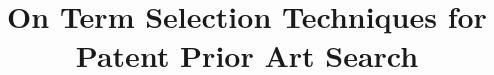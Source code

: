 \documentclass{sig-alternate-2013}
\begin{document}
%

\title{On Term Selection Techniques for Patent Prior Art Search
}
%
%
%
%
%

\end{document}
